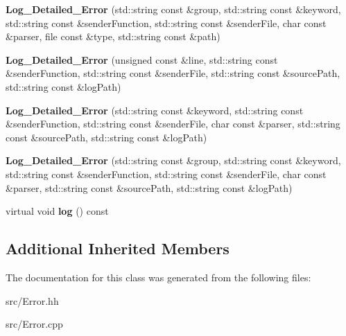\begin{DoxyCompactItemize}
\item 
\hypertarget{classstb_1_1Log__Detailed__Error_ad3c5a1106ed19447c3a69d918d06ad53}{{\bfseries Log\+\_\+\+Detailed\+\_\+\+Error} (std\+::string const \&group, std\+::string const \&keyword, std\+::string const \&sender\+Function, std\+::string const \&sender\+File, char const \&parser, file const \&type, std\+::string const \&path)}\label{classstb_1_1Log__Detailed__Error_ad3c5a1106ed19447c3a69d918d06ad53}

\item 
\hypertarget{classstb_1_1Log__Detailed__Error_a0310579cd60487f937cc4080a4663e12}{{\bfseries Log\+\_\+\+Detailed\+\_\+\+Error} (unsigned const \&line, std\+::string const \&sender\+Function, std\+::string const \&sender\+File, std\+::string const \&source\+Path, std\+::string const \&log\+Path)}\label{classstb_1_1Log__Detailed__Error_a0310579cd60487f937cc4080a4663e12}

\item 
\hypertarget{classstb_1_1Log__Detailed__Error_a3bbad836c0280d54f79872329e061075}{{\bfseries Log\+\_\+\+Detailed\+\_\+\+Error} (std\+::string const \&keyword, std\+::string const \&sender\+Function, std\+::string const \&sender\+File, char const \&parser, std\+::string const \&source\+Path, std\+::string const \&log\+Path)}\label{classstb_1_1Log__Detailed__Error_a3bbad836c0280d54f79872329e061075}

\item 
\hypertarget{classstb_1_1Log__Detailed__Error_a942604f3953743adcfeeaa20684a6c1b}{{\bfseries Log\+\_\+\+Detailed\+\_\+\+Error} (std\+::string const \&group, std\+::string const \&keyword, std\+::string const \&sender\+Function, std\+::string const \&sender\+File, char const \&parser, std\+::string const \&source\+Path, std\+::string const \&log\+Path)}\label{classstb_1_1Log__Detailed__Error_a942604f3953743adcfeeaa20684a6c1b}

\item 
\hypertarget{classstb_1_1Log__Detailed__Error_a60b31caad21423f0be1be4e0e77a72fa}{virtual void {\bfseries log} () const }\label{classstb_1_1Log__Detailed__Error_a60b31caad21423f0be1be4e0e77a72fa}

\end{DoxyCompactItemize}
\subsection*{Additional Inherited Members}


The documentation for this class was generated from the following files\+:\begin{DoxyCompactItemize}
\item 
src/Error.\+hh\item 
src/Error.\+cpp\end{DoxyCompactItemize}

